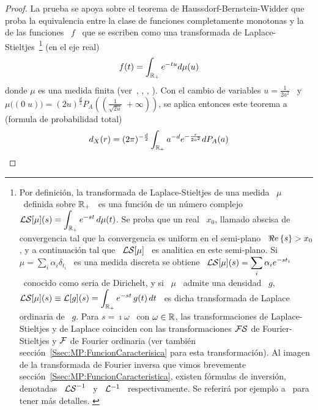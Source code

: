 \begin{proof}
  La prueba se apoya sobre el teorema de Haussdorf-Bernstein-Widder que proba la
  equivalencia entre la  clase de funciones completamente monotonas  y la de las
  funciones   \   $f$   \   que   se   escriben   como   una   transformada   de
  Laplace-Stieltjes~\footnote{Por     definici\'on,    la     transformada    de
    Laplace-Stieltjes de una medida \ $\mu$  \ definida sobre $\mathbb{R}_+$ \ es una
    funci\'on   de  un   n\'umero  complejo   \  $\displaystyle   \mathcal{LS}[\mu](s)  =
    \int_{\mathbb{R}_+} e^{-s t}  \, d\mu(t)$. Se proba que un  real \ $x_0$, llamado
    abscisa de convergencia tal que  la convergencia es uniform en el semi-plano
    \ $\Re e \left\{ s \right\} > x_0$, y a  continuaci\'on tal que \ $\displaystyle \mathcal{LS}[\mu]$ \
    es analitica en este semi-plano.   Si \ $\displaystyle \mu = \sum_i \alpha_i
    \delta_{t_i}$  \  es  una   medida  discreta  se  obtiene  \  $\displaystyle
    \mathcal{LS}[\mu](s)  =  \sum_i  \alpha_i  e^{-s  t_i}$  \  conocido  como  seria  de
    Dirichelt,  y  si  \ $\mu$  \  admite  una  densidad \  $g$,  $\displaystyle
    \mathcal{LS}[\mu](s) \equiv  \mathcal{L}[g](s) = \int_{\mathbb{R}_+} e^{-s  t} \, g(t) \,  dt$ \ es
    dicha transformada de Laplace ordinaria de  \ $g$.  Para $s = \imath \omega$
    \ con  $\omega \in  \mathbb{R}$, las transformaciones  de Laplace-Stieltjes  y de
    Laplace coinciden con las transformaciones $\mathcal{FS}$ de Fourier-Stieltjes y $\mathcal{F}$
    de           Fourier            ordinaria           (ver           tambi\'en
    secci\'on~\ref{Ssec:MP:FuncionCaracterisica} para esta transformaci\'on). Al
    imagen  de   la  transformada  de  Fourier  inversa   que  vimos  brevemente
    secci\'on~\ref{Ssec:MP:FuncionCaracteristica},    existen    f\'ormulas   de
    inversi\'on, denotadas \  $\mathcal{LS}^{-1}$ \ y \ $\mathcal{L}^{-1}$  \ respectivamente.  Se
    referir\'a     por    ejemplo     a~\cite{Wid46}     para    tener     m\'as
    detalles. \label{Foot:MP:LaplaceStieltjes}} (en el eje real)
  \[
  f(t) = \int_{\mathbb{R}_+} e^{-t u} d\mu(u)
  \]
  donde  $\mu$  es  una  medida finita  (ver~\cite[Teo.~3]{Sch38},  \cite{Ber29,
    Haus21:I, Haus21:II,  Wid32}, \cite[\S~12]{Wid46}, \cite[\S~XIII.4]{Fel71}).
  Con el  cambio de variables  $u = \frac{1}{2  a^2}$ \ y  \ $\mu\big( (0  \; u)
  \big) =  (2 u)^{\frac{d}{2}} P_A\left( \left( \frac{1}{\sqrt{2  u}} \; +\infty
    \right) \right)$,  se aplica entonces este teorema  a (formula de probabilidad
  total)
  \[
  d_X(r)  =  (2 \pi)^{-\frac{d}{2}} \int_{\mathbb{R}_+} a^{-d} e^{-\frac{r}{2 a^2}} dP_A(a) 
  \]


\end{proof}
